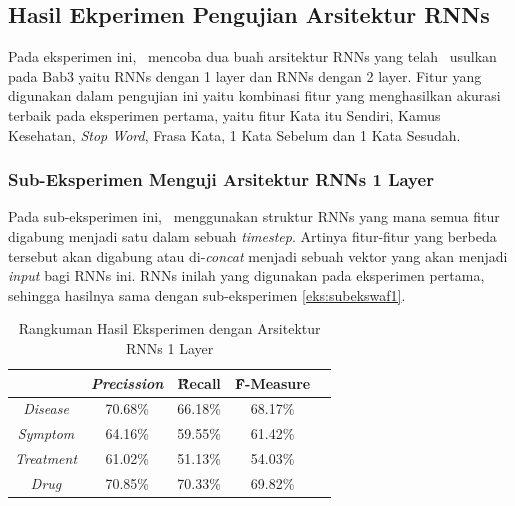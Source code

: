 	
	
  
  
    \subsection{Hasil Ekperimen Pengujian Arsitektur RNNs}\label{eks:eks2}
    
    Pada eksperimen ini, \saya~mencoba dua buah arsitektur RNNs yang telah \saya~usulkan pada Bab3 yaitu RNNs dengan 1 layer dan RNNs dengan 2 layer. Fitur yang digunakan dalam pengujian ini yaitu kombinasi fitur yang menghasilkan akurasi terbaik pada eksperimen pertama, yaitu fitur Kata itu Sendiri, Kamus Kesehatan, \textit{Stop Word}, Frasa Kata, 1 Kata Sebelum dan 1 Kata Sesudah.
    
    \subsubsection{Sub-Eksperimen Menguji Arsitektur RNNs 1 Layer}\label{eks2:subeksrnn1}
    Pada sub-eksperimen ini, \saya~menggunakan struktur RNNs yang mana semua fitur digabung menjadi satu dalam sebuah \textit{timestep}.
    Artinya fitur-fitur yang berbeda tersebut akan digabung atau di-\textit{concat} menjadi sebuah vektor yang akan menjadi \textit{input} bagi RNNs ini. RNNs inilah yang digunakan pada eksperimen pertama, sehingga hasilnya sama dengan sub-eksperimen \ref{eks:subekswaf1}.
    
    \begin{table}
    	\centering
    	\caption{Rangkuman Hasil Eksperimen dengan Arsitektur RNNs 1 Layer}
    	\begin{tabular}{|c|c|c|c|c|}
    		\hline
    		& \textit{Precission} & \f{\f{Recall}} & \f{\f{F-Measure}} \\ \hline
    		\textit{Disease}      & 70.68\%             & 66.18\%        & 68.17\%           \\ \hline
    		\textit{Symptom}      & 64.16\%             & 59.55\%        & 61.42\%           \\ \hline
    		\textit{Treatment}    & 61.02\%             & 51.13\%        & 54.03\%           \\ \hline
    		\textit{Drug}		  & 70.85\%             & 70.33\%        & 69.82\%           \\ \hline
    	\end{tabular}
    	\label{table:owndict9}
    \end{table}
    
